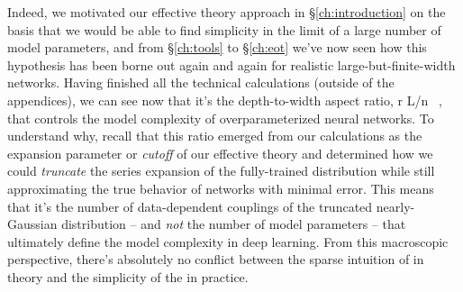 Indeed,
we 
motivated our effective theory approach in \S\ref{ch:introduction} on the basis that we would be able to find simplicity in the limit of a large number of model parameters, and from \S\ref{ch:tools} to \S\ref{ch:eot}  we've now seen how this hypothesis has been borne out again and again for 
realistic large-but-finite-width networks.
Having finished all the technical calculations (outside of the appendices), we can see now
that it's the depth-to-width aspect ratio,
\be
r \equiv L/n \, ,
\ee
that controls the model complexity of overparameterized neural networks.
To understand why, recall that 
this ratio emerged from our calculations as the expansion parameter or \emph{cutoff} of our effective theory and determined how we could \emph{truncate}
the series expansion of the 
fully-trained distribution
while still approximating the true behavior of networks with minimal error. 
This means that
it's the number of data-dependent couplings of the truncated nearly-Gaussian distribution -- and \emph{not} the 
number of 
model parameters -- that ultimately define the model complexity in deep learning. From this macroscopic perspective, there's absolutely no conflict between the 
sparse 
intuition of  in theory and the 
simplicity of 
the  in practice.














